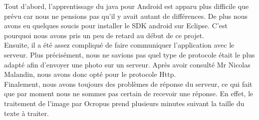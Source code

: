 Tout d'abord, l'apprentissage du java pour Android est apparu plus difficile que prévu car nous ne pensions pas qu'il y avait autant de différences. De plus nous avons eu quelques soucis pour installer le SDK android sur Eclipse. C'est pourquoi nous avons pris un peu de retard au début de ce projet.\\

Ensuite, il a été assez compliqué de faire communiquer l'application avec le serveur. Plus précisément, nous ne savions pas quel type de protocole était le plus adapté afin d'envoyer une photo sur un serveur. Après avoir consulté Mr Nicolas Malandin, nous avons donc opté pour le protocole Http.\\

Finalement, nous avons toujours des problèmes de réponse du serveur, ce qui fait que par moment nous ne sommes pas certain de recevoir une réponse. En effet, le traitement de l'image par Ocropus prend plusieurs minutes suivant la taille du texte à traiter.
